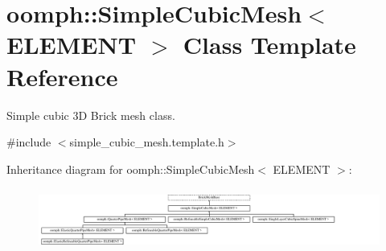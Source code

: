 \hypertarget{classoomph_1_1SimpleCubicMesh}{}\section{oomph\+:\+:Simple\+Cubic\+Mesh$<$ E\+L\+E\+M\+E\+NT $>$ Class Template Reference}
\label{classoomph_1_1SimpleCubicMesh}


Simple cubic 3D Brick mesh class.  




{\ttfamily \#include $<$simple\+\_\+cubic\+\_\+mesh.\+template.\+h$>$}

Inheritance diagram for oomph\+:\+:Simple\+Cubic\+Mesh$<$ E\+L\+E\+M\+E\+NT $>$\+:\begin{figure}[H]
\begin{center}
\leavevmode
\includegraphics[height=2.046783cm]{classoomph_1_1SimpleCubicMesh}
\end{center}
\end{figure}
